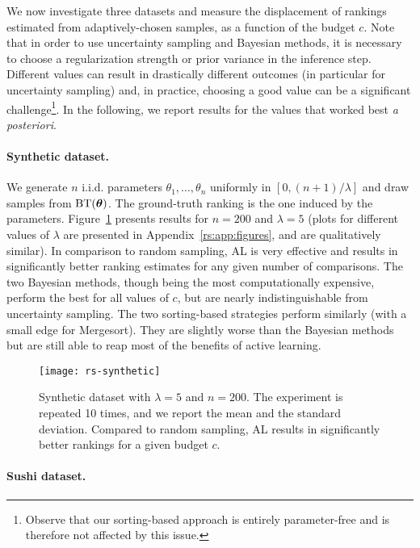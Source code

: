 We now investigate three datasets and measure the displacement of rankings estimated from adaptively-chosen samples, as a function of the budget $c$.
Note that in order to use uncertainty sampling and Bayesian methods, it is necessary to choose a regularization strength or prior variance in the inference step.
Different values can result in drastically different outcomes (in particular for uncertainty sampling) and, in practice, choosing a good value can be a significant challenge\footnote{Observe that our sorting-based approach is entirely parameter-free and is therefore not affected by this issue.}.
In the following, we report results for the values that worked best \emph{a posteriori}.


\paragraph{Synthetic dataset.}

We generate $n$ i.i.d. parameters $\theta_1, \ldots, \theta_n$ uniformly in $[0, (n+1) / \lambda]$ and draw samples from $\operatorname{BT}(\bm{\theta})$.
The ground-truth ranking is the one induced by the parameters.
Figure~\ref{rs:fig:synthetic} presents results for $n = \num{200}$ and $\lambda = \num{5}$ (plots for different values of $\lambda$ are presented in Appendix~\ref{rs:app:figures}, and are qualitatively similar).
In comparison to random sampling, AL is very effective and results in significantly better ranking estimates for any given number of comparisons.
The two Bayesian methods, though being the most computationally expensive, perform the best for all values of $c$, but are nearly indistinguishable from uncertainty sampling.
The two sorting-based strategies perform similarly (with a small edge for Mergesort).
They are slightly worse than the Bayesian methods but are still able to reap most of the benefits of active learning.

\begin{figure}[t]
\centering
\texttt{[image: rs-synthetic]}
\caption{
Synthetic dataset with $\lambda = 5$ and $n = 200$.
The experiment is repeated \num{10} times, and we report the mean and the standard deviation.
Compared to random sampling, AL results in significantly better rankings for a given budget $c$.
}
\label{rs:fig:synthetic}
\end{figure}


\paragraph{Sushi dataset.}

